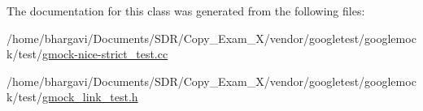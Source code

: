 The documentation for this class was generated from the following files\+:\begin{DoxyCompactItemize}
\item 
/home/bhargavi/\+Documents/\+S\+D\+R/\+Copy\+\_\+\+Exam\+\_\+X/vendor/googletest/googlemock/test/\hyperlink{gmock-nice-strict__test_8cc}{gmock-\/nice-\/strict\+\_\+test.\+cc}\item 
/home/bhargavi/\+Documents/\+S\+D\+R/\+Copy\+\_\+\+Exam\+\_\+X/vendor/googletest/googlemock/test/\hyperlink{gmock__link__test_8h}{gmock\+\_\+link\+\_\+test.\+h}\end{DoxyCompactItemize}
